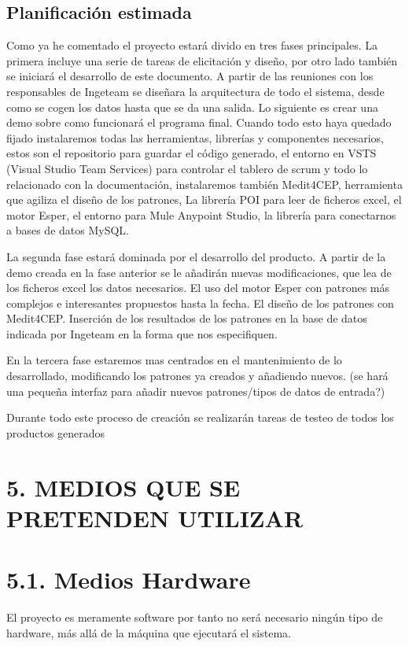 \documentclass[a4paper]{article}
\begin{document}
\subsection{Planificación estimada}

Como ya he comentado el proyecto estará divido en tres fases principales. La primera incluye una serie de tareas de elicitación y diseño, por otro lado también se iniciará el desarrollo de este documento. A partir de las reuniones con los responsables de Ingeteam se diseñara la arquitectura de todo el sistema, desde como se cogen los datos hasta que se da una salida. Lo siguiente es crear una demo sobre como funcionará el programa final. Cuando todo esto haya quedado fijado instalaremos todas las herramientas, librerías y componentes necesarios, estos son el repositorio para guardar el código generado, el entorno en VSTS (Visual Studio Team Services) para controlar el tablero de scrum y todo lo relacionado con la documentación, instalaremos también Medit4CEP, herramienta que agiliza el diseño de los patrones, La librería POI para leer de ficheros excel, el motor Esper, el entorno para Mule Anypoint Studio, la librería para conectarnos a bases de datos MySQL.

La segunda fase estará dominada por el desarrollo del producto. A partir de la demo creada en la fase anterior se le añadirán nuevas modificaciones, que lea de los ficheros excel los datos necesarios. El uso del motor Esper con patrones más complejos e interesantes propuestos hasta la fecha. El diseño de los patrones con Medit4CEP. Inserción de los resultados de los patrones en la base de datos indicada por Ingeteam en la forma que nos especifiquen.

En la tercera fase estaremos mas centrados en el mantenimiento de lo desarrollado, modificando los patrones ya creados y añadiendo nuevos. (se hará una pequeña interfaz para añadir nuevos patrones/tipos de datos de entrada?)

Durante todo este proceso de creación se realizarán tareas de testeo de todos los productos generados

\section{5. MEDIOS QUE SE PRETENDEN UTILIZAR}
\section{5.1. Medios Hardware}

El proyecto es meramente software por tanto no será necesario ningún tipo de hardware, más allá de la máquina que ejecutará el sistema.
\end{document}
